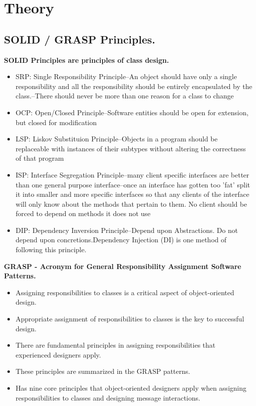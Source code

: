 \documentclass[12pt,a4paper,titlepage]{article}
\begin{document}
\section{Theory}

\subsection{SOLID / GRASP Principles.}
\textbf{SOLID Principles are principles of class design.}
\begin{itemize}
	\item SRP: Single Responsibility Principle–An object should have only a single responsibility and all the responsibility should be entirely encapsulated by the class.–There should never be more than one reason for a class to change
	\item OCP: Open/Closed Principle–Software entities should be open for extension, but closed for modification
	\item LSP: Liskov Substituion Principle–Objects in a program should be replaceable with instances of their subtypes without altering the correctness of that program
	\item ISP: Interface Segregation Principle–many client specific interfaces are better than one general purpose interface–once an interface has gotten too 'fat' split it into smaller and more specific interfaces so that any clients of the interface will only know about the methods that pertain to them. No client should be forced to depend on methods it does not use
	\item DIP: Dependency Inversion Principle–Depend upon Abstractions. Do not depend upon concretions.Dependency Injection (DI) is one method of following this principle.
\end{itemize}

\textbf{GRASP - Acronym for General Responsibility Assignment Software Patterns.}
\begin{itemize}
	\item Assigning responsibilities to classes is a critical aspect of object-oriented design.
	\item Appropriate assignment of responsibilities to classes is the key to successful design.
	\item There are fundamental principles in assigning responsibilities that experienced designers apply.
	\item These principles are summarized in the GRASP patterns.
	\item Has nine core principles that object-oriented designers apply when assigning responsibilities to classes and designing message interactions.
\end{itemize}
\clearpage
\end{document}
